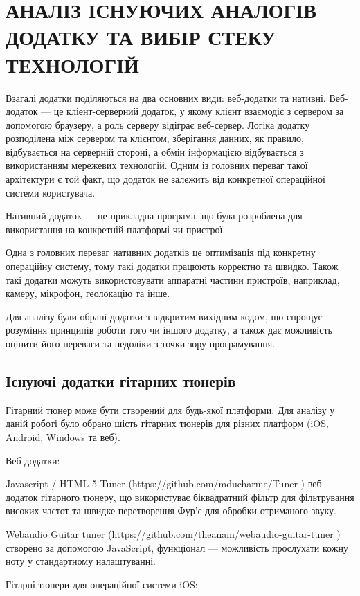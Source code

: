 \section{АНАЛІЗ ІСНУЮЧИХ АНАЛОГІВ ДОДАТКУ ТА ВИБІР СТЕКУ ТЕХНОЛОГІЙ}

Взагалі додатки поділяються на два основних види: веб-додатки та нативні. Веб-додаток — це кліент-серверний додаток, у якому клієнт взаємодіє з сервером за допомогою браузеру, а роль серверу відіграє веб-сервер. Логіка додатку розподілена між сервером та клієнтом, зберігання данних, як правило, відбувається на серверній стороні, а обмін інформацією відбувається з використанням мережевих технологій. Одним із головних переваг такої архітектури є той факт, що додаток не залежить від конкретної операційної системи користувача.

Нативний додаток — це прикладна програма, що була розроблена для використання на конкретній платформі чи пристрої.

Одна з головних переваг нативних додатків це оптимізація під конкретну операційну систему, тому такі додатки працюють корректно та швидко. Також такі додатки можуть використовувати аппаратні частини пристроїв, наприклад, камеру, мікрофон, геолокацію та інше.

Для аналізу були обрані додатки з відкритим вихідним кодом, що спрощує розуміння принципів роботи того чи іншого додатку, а також дає можливість оцінити його переваги та недоліки з точки зору програмування.

\subsection{Існуючі додатки гітарних тюнерів}

Гітарний тюнер може бути створений для будь-якої платформи. Для аналізу у даній роботі було обрано шість гітарних тюнерів для різних платформ (iOS, Android, Windows та веб).

Веб-додатки:

Javascript / HTML 5 Tuner (https://github.com/mducharme/Tuner
)  веб-додаток гітарного тюнеру, що використуває біквадратний фільтр для фільтрування високих частот та швидке перетворення Фур'є для обробки отриманого звуку.

Webaudio Guitar tuner (https://github.com/theanam/webaudio-guitar-tuner
) створено за допомогою JavaScript, функціонал — можливість прослухати кожну ноту у стандартному налаштуванні. 

Гітарні тюнери для операційної системи iOS:

